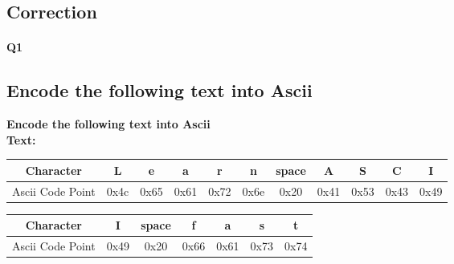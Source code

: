 \subsection{Correction}


\paragraph{Q1}




\subsection*{Encode the following text into Ascii}
      \textbf{Encode the following text into Ascii}\\
  \textbf{Text:} \\[6pt]

      \begin{tabular}{|c|c|c|c|c|c|c|c|c|c|c|}
        \hline
        Character
          &                 L
          &                 e
          &                 a
          &                 r
          &                 n
          &                 space
          &                 A
          &                 S
          &                 C
          &                 I
 \\
        \hline
        Ascii Code Point
          & 0x4c
          & 0x65
          & 0x61
          & 0x72
          & 0x6e
          & 0x20
          & 0x41
          & 0x53
          & 0x43
          & 0x49
 \\
        \hline
      \end{tabular}


    \vspace{1em} %

      \begin{tabular}{|c|c|c|c|c|c|c|}
        \hline
        Character
          &                 I
          &                 space
          &                 f
          &                 a
          &                 s
          &                 t
 \\
        \hline
        Ascii Code Point
          & 0x49
          & 0x20
          & 0x66
          & 0x61
          & 0x73
          & 0x74
 \\
        \hline
      \end{tabular}


    \vspace{1em} %


